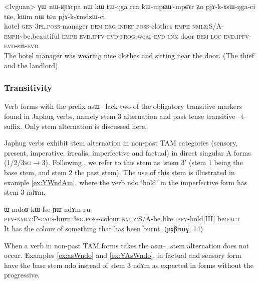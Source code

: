 \documentclass[oldfontcommands,oneside,a4paper,11pt]{article}
\newcommand{\ipa}[1]{{\phon \mbox{#1}}} %
\newcommand{\factual}[1]{\textsc{:fact}}
\begin{document}
\begin{exe}
\ex \label{ex:pjAkAsWNgaci}
\gll
<lvguan>	\ipa{ɣɯ} 	\ipa{nɯ-ʁɲɤrpa} 	\ipa{nɯ} 	\ipa{kɯ} 	\ipa{tɯ-ŋga} 	\ipa{rca} 	\ipa{kɯ-mpɕɯ\textasciitilde{}mpɕɤr} 	\ipa{ʑo} 	\ipa{pjɤ-k-ɤsɯ-ŋga-ci} 	\ipa{tɕe,} 	\ipa{kɯm} 	\ipa{nɯ} 	\ipa{tɕu} 	\ipa{pjɤ-k-ɤmdzɯ-ci.} 	\\
hotel \textsc{gen} \textsc{3pl.poss}-manager \textsc{dem} \textsc{erg} \textsc{indef.poss}-clothes \textsc{emph} \textsc{nmlz:S/A-emph}\textasciitilde{}be.beautiful \textsc{emph} \textsc{evd.ipfv-evd-prog}-wear-\textsc{evd} \textsc{lnk} door \textsc{dem} \textsc{loc} \textsc{evd.ipfv-evd}-sit-\textsc{evd}
\\
\glt The hotel manager was wearing nice clothes and sitting near the door. (The thief and the landlord)
\end{exe}

\subsubsection{Transitivity}

Verb forms with the prefix \ipa{asɯ--} lack two of the obligatory transitive markers found in Japhug verbs, namely stem 3 alternation and past tense transitive \ipa{--t--} suffix. Only stem alternation is discussed here.

Japhug verbs exhibit stem alternation in non-past TAM categories (sensory, present, imperative, irrealis, imperfective and factual) in direct singular A forms (\textsc{1/2/3sg}$\rightarrow$3). Following \citet{jackson00puxi}, we refer to this stem as `stem 3' (stem 1 being the base stem, and stem 2 the past stem). The use of this stem is illustrated in example \ref{ex:YWndAm}, where the verb \ipa{ndo} `hold' in the imperfective form has stem 3 \ipa{ndɤm}.

\begin{exe}
\ex \label{ex:YWndAm}
\gll \ipa{kɤ-kɤ-sɯ-ɕke} 	\ipa{ɯ-mdoʁ} 	\ipa{kɯ-fse} 	\ipa{ɲɯ-ndɤm} 		\ipa{ŋu} \\
\textsc{pfv-nmlz:P-caus}-burn \textsc{3sg.poss}-colour \textsc{nmlz:S/A}-be.like \textsc{ipfv}-hold[III] be\factual{} \\
\glt  It has the colour of something that has been burnt. (\ipa{ɲɤβrɯɣ}, 14)
\end{exe}

When a verb in non-past TAM forms takes the \ipa{asɯ--}, stem alternation does not occur. Examples \ref{ex:asWndo} and \ref{ex:YAsWndo}, in factual and sensory form have the base stem \ipa{ndo} instead of stem 3 \ipa{ndɤm} as expected in forms without the progressive.
\end{document}
